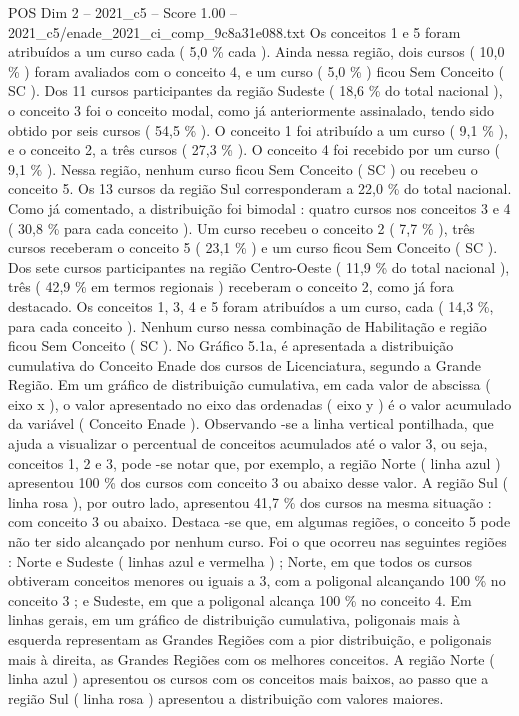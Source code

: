 \begin{textsample}{POS Dim 2 – 2021\_c5 – Score 1.00 – 2021\_c5/enade\_2021\_ci\_comp\_9c8a31e088.txt}
Os conceitos 1 e 5 foram atribuídos a um curso cada ( 5,0 \% cada ).
Ainda nessa região, dois cursos ( 10,0 \% ) foram avaliados com o conceito 4, e um curso ( 5,0 \% ) ficou Sem Conceito ( SC ).
Dos 11 cursos participantes da região Sudeste ( 18,6 \% do total nacional ), o conceito 3 foi o conceito modal, como já anteriormente assinalado, tendo sido obtido por seis cursos ( 54,5 \% ).
O conceito 1 foi atribuído a um curso ( 9,1 \% ), e o conceito 2, a três cursos ( 27,3 \% ).
O conceito 4 foi recebido por um curso ( 9,1 \% ).
Nessa região, nenhum curso ficou Sem Conceito ( SC ) ou recebeu o conceito 5.
Os 13 cursos da região Sul corresponderam a 22,0 \% do total nacional.
Como já comentado, a distribuição foi bimodal : quatro cursos nos conceitos 3 e 4 ( 30,8 \% para cada conceito ).
Um curso recebeu o conceito 2 ( 7,7 \% ), três cursos receberam o conceito 5 ( 23,1 \% ) e um curso ficou Sem Conceito ( SC ).
Dos sete cursos participantes na região Centro-Oeste ( 11,9 \% do total nacional ), três ( 42,9 \% em termos regionais ) receberam o conceito 2, como já fora destacado.
Os conceitos 1, 3, 4 e 5 foram atribuídos a um curso, cada ( 14,3 \%, para cada conceito ).
Nenhum curso nessa combinação de Habilitação e região ficou Sem Conceito ( SC ).
No Gráfico 5.1a, é apresentada a distribuição cumulativa do Conceito Enade dos cursos de Licenciatura, segundo a Grande Região.
Em um gráfico de distribuição cumulativa, em cada valor de abscissa ( eixo x ), o valor apresentado no eixo das ordenadas ( eixo y ) é o valor acumulado da variável ( Conceito Enade ).
Observando -se a linha vertical pontilhada, que ajuda a visualizar o percentual de conceitos acumulados até o valor 3, ou seja, conceitos 1, 2 e 3, pode -se notar que, por exemplo, a região Norte ( linha azul ) apresentou 100 \% dos cursos com conceito 3 ou abaixo desse valor.
A região Sul ( linha rosa ), por outro lado, apresentou 41,7 \% dos cursos na mesma situação : com conceito 3 ou abaixo.
Destaca -se que, em algumas regiões, o conceito 5 pode não ter sido alcançado por nenhum curso.
Foi o que ocorreu nas seguintes regiões : Norte e Sudeste ( linhas azul e vermelha ) ; Norte, em que todos os cursos obtiveram conceitos menores ou iguais a 3, com a poligonal alcançando 100 \% no conceito 3 ; e Sudeste, em que a poligonal alcança 100 \% no conceito 4.
Em linhas gerais, em um gráfico de distribuição cumulativa, poligonais mais à esquerda representam as Grandes Regiões com a pior distribuição, e poligonais mais à direita, as Grandes Regiões com os melhores conceitos.
A região Norte ( linha azul ) apresentou os cursos com os conceitos mais baixos, ao passo que a região Sul ( linha rosa ) apresentou a distribuição com valores maiores.

\end{textsample}
